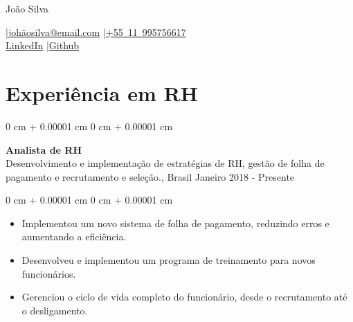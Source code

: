\documentclass[10pt, letterpaper]{article}
\newenvironment{highlights}{
    \begin{itemize}[
        topsep=0.10 cm,
        parsep=0.10 cm,
        partopsep=0pt,
        itemsep=0pt,
        leftmargin=0 cm + 10pt
    ]
}{
    \end{itemize}
}
\newenvironment{onecolentry}{
    \begin{adjustwidth}{
        0 cm + 0.00001 cm
    }{
        0 cm + 0.00001 cm
    }
}{
    \end{adjustwidth}
}
\newenvironment{header}{
    \setlength{\topsep}{0pt}\par\kern\topsep\centering\linespread{1.5}
}{
    \par\kern\topsep
}
\begin{document}
\begin{header}
    {\fontsize{25pt}{25pt}\selectfont João Silva}

    \vspace{0pt}

    \normalsize
    \mbox{} \enskip|\enskip \mbox{\href{mailto:johãosilva@email.com}{johãosilva@email.com}} \enskip|\enskip \mbox{\href{tel:+5511995756617}{+55 11 995756617}} \\
    \mbox{\href{}{LinkedIn}} \enskip|\enskip \mbox{\href{}{Github}}
\end{header}

\vspace{5pt - 0.1cm}

\section{Experiência em RH}

\begin{onecolentry}
    \setcolumnwidth{\fill, 4.5cm}
    \begin{paracol}{2}
        \textbf{Analista de RH} \\ Desenvolvimento e implementação de estratégias de RH, gestão de folha de pagamento e recrutamento e seleção., Brasil
        \switchcolumn
        \raggedleft Janeiro 2018 - Presente
    \end{paracol}
\end{onecolentry}
\vspace{0.10cm}
\begin{onecolentry}
    \begin{highlights}
                \item Implementou um novo sistema de folha de pagamento, reduzindo erros e aumentando a eficiência.
                \item Desenvolveu e implementou um programa de treinamento para novos funcionários.
                \item Gerenciou o ciclo de vida completo do funcionário, desde o recrutamento até o desligamento.
    \end{highlights}
\end{onecolentry}

\vspace{0.2cm}
\end{document}

